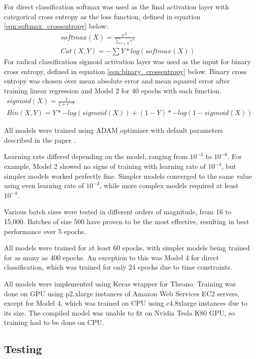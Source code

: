 \documentclass{article}
\begin{document}
\begin{CJK*}{UTF8}{min}
For direct classification softmax was used as the final activation layer with categorical cross entropy as the loss function, defined in equation \ref{eqn:softmax_crossentropy} below:
\begin{multline}\label{eqn:softmax_crossentropy}
    softmax(X) = \frac{e^X}{\sum_{x \in X} e^x}\\
    Cat(X,Y) =  - \sum Y * log(softmax(X))
\end{multline}
For radical classification sigmoid activation layer was used as the input for binary cross entropy, defined in equation \ref{eqn:binary_crossentropy} below. Binary cross entropy was chosen over mean absolute error and mean squared error after training linear regression and Model 2 for 40 epochs with each function.
\begin{multline}\label{eqn:binary_crossentropy}
    sigmoid(X) = \frac{1}{1 + e^{-X}}\\
    Bin(X,Y) = Y * -log(sigmoid(X)) + (1 - Y) * -log(1 - sigmoid(X))
\end{multline}

All models were trained using ADAM optimizer with default parameters described in the paper \cite{DBLP:journals/corr/KingmaB14}.

Learning rate differed depending on the model, ranging from $10^{-4}$ to $10^{-6}$. For example, Model 2 showed no signs of training with learning rate of $10^{-4}$, but simpler models worked perfectly fine. Simpler models converged to the same value using even learning rate of $10^{-3}$, while more complex models required at least $10^{-4}$.

Various batch sizes were tested in different orders of magnitude, from 16 to 15,000. Batches of size 500 have proven to be the most effective, resulting in best performance over 5 epochs.

All models were trained for at least 60 epochs, with simpler models being trained for as many as 400 epochs. An exception to this was Model 4 for direct classification, which was trained for only 24 epochs due to time constraints.

All models were implemented using Keras wrapper for Theano\cite{chollet2015keras}. Training was done on GPU using p2.xlarge instances of Amazon Web Services EC2 servers, except for Model 4, which was trained on CPU using c4.8xlarge instances due to its size. The compiled model was unable to fit on Nvidia Tesla K80 GPU, so training had to be done on CPU.

\subsection{Testing}

\end{CJK*}
\end{document}

